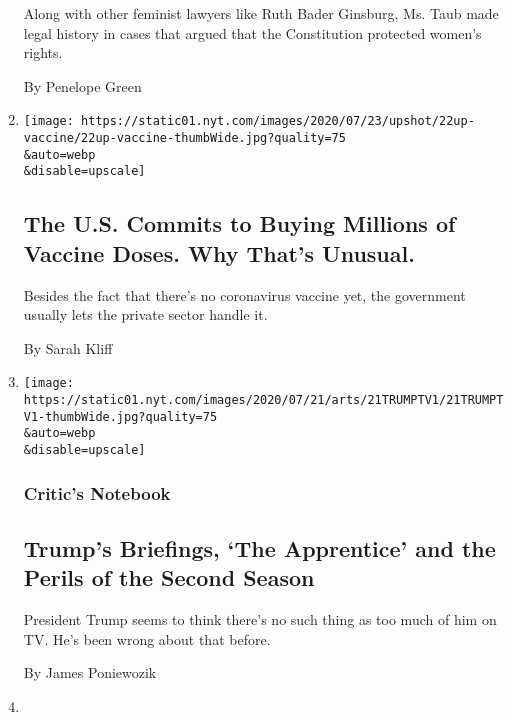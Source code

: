 \begin{enumerate}
  Along with other feminist lawyers like Ruth Bader Ginsburg, Ms. Taub
  made legal history in cases that argued that the Constitution
  protected women's rights.

  By Penelope Green
\item
  \href{/2020/07/22/upshot/vaccine-coronavirus-government-purchase.html}{}

  \texttt{[image: https://static01.nyt.com/images/2020/07/23/upshot/22up-vaccine/22up-vaccine-thumbWide.jpg?quality=75\\\&auto=webp\\\&disable=upscale]}

  \hypertarget{the-us-commits-to-buying-millions-of-vaccine-doses-why-thats-unusual}{%
  \subsection{The U.S. Commits to Buying Millions of Vaccine Doses. Why
  That's
  Unusual.}\label{the-us-commits-to-buying-millions-of-vaccine-doses-why-thats-unusual}}

  Besides the fact that there's no coronavirus vaccine yet, the
  government usually lets the private sector handle it.

  By Sarah Kliff
\item
  \href{/2020/07/21/arts/television/trump-briefings.html}{}

  \texttt{[image: https://static01.nyt.com/images/2020/07/21/arts/21TRUMPTV1/21TRUMPTV1-thumbWide.jpg?quality=75\\\&auto=webp\\\&disable=upscale]}

  \hypertarget{critics-notebook}{%
  \subsubsection{Critic's Notebook}\label{critics-notebook}}

  \hypertarget{trumps-briefings-the-apprentice-and-the-perils-of-the-second-season}{%
  \subsection{Trump's Briefings, `The Apprentice' and the Perils of the
  Second
  Season}\label{trumps-briefings-the-apprentice-and-the-perils-of-the-second-season}}

  President Trump seems to think there's no such thing as too much of
  him on TV. He's been wrong about that before.

  By James Poniewozik
\item
  \href{/2020/07/13/us/politics/coronavirus-health-insurance-trump.html}{}


\end{enumerate}
